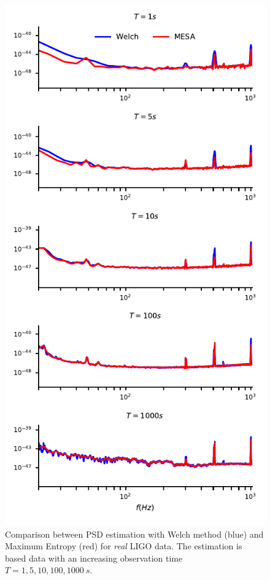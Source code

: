 \documentclass[twocolumn,showpacs,preprintnumbers,nofootinbib,prd,
superscriptaddress,10pt]{revtex4-1}
\begin{document}
\begin{figure}
\end{figure}

\begin{figure}
	\caption{Comparison between PSD estimation with Welch method (blue) and Maximum Entropy (red) for \textit{real} LIGO data. The estimation is based data with an increasing observation time $T = 1, 5, 10, 100, \SI{1000}{s}$.}
	\label{fig:mem_welch_realdata}
	\includegraphics{Images/comparison_LVC_data/comparison_LVC_data_overall_fake_False.pdf}
\end{figure}
\end{document}

